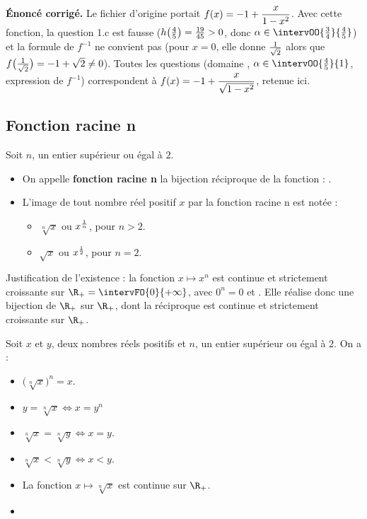 \begin{noteprof}
\textbf{Énoncé corrigé.} Le fichier d'origine portait $f(x)=-1+\dfrac{x}{1-x^2}$. Avec cette fonction, la question 1.c est fausse ($h\big(\frac{4}{5}\big)=\frac{19}{45}>0$, donc $\alpha\in\intervOO{\f{3}{4}}{\f{4}{5}}$) et la formule de $f^{-1}$ ne convient pas (pour $x=0$, elle donne $\frac{1}{\sqrt2}$ alors que $f\big(\frac{1}{\sqrt2}\big)=-1+\sqrt2\neq 0$). Toutes les questions (domaine , $\alpha\in\intervOO{\f{4}{5}}{1}$, expression de $f^{-1}$) correspondent à $f(x)=-1+\dfrac{x}{\sqrt{1-x^2}}$, retenue ici.
\end{noteprof}
\ifenseignant %
\subsection{Fonction racine n}
\begin{definition}
	Soit $n$, un entier supérieur ou égal à $2$.
	\begin{itemize}
		\item On appelle \textbf{fonction racine n} la bijection réciproque de la fonction : .
		\item L'image de tout nombre réel positif $x$ par la fonction racine n est notée :
		\begin{itemize}
			\item $\sqrt[n]{x}$ ou $x^{\frac{1}{n}}$, pour $n>2$.
			\item $\sqrt{x}$ ou $x^{\frac{1}{2}}$, pour $n=2$.
		\end{itemize}
	\end{itemize}
\end{definition}
\begin{preuve}
Justification de l'existence : la fonction $x\longmapsto x^n$ est continue et strictement croissante sur $\R_+=\intervFO{0}{+\infty}$, avec $0^n=0$ et . Elle réalise donc une bijection de $\R_+$ sur $\R_+$, dont la réciproque est continue et strictement croissante sur $\R_+$.
\end{preuve}
\hspace*{-0.8cm}
\begin{propriete}
Soit $x$ et $y$, deux nombres réels positifs et $n$, un entier supérieur ou égal à $2$. On a :
\begin{itemize}
	\item $\big(\sqrt[n]{x}\big)^n=x$.
	\item $y=\sqrt[n]{x} \iff x=y^n$
	\item $\sqrt[n]{x}=\sqrt[n]{y}\iff x=y$.
	\item $\sqrt[n]{x}<\sqrt[n]{y}\iff x<y$.
	\item La fonction $x\longmapsto \sqrt[n]{x}$ est continue sur $\R_+$.
	\item {}
\end{itemize}

\end{propriete}\\
